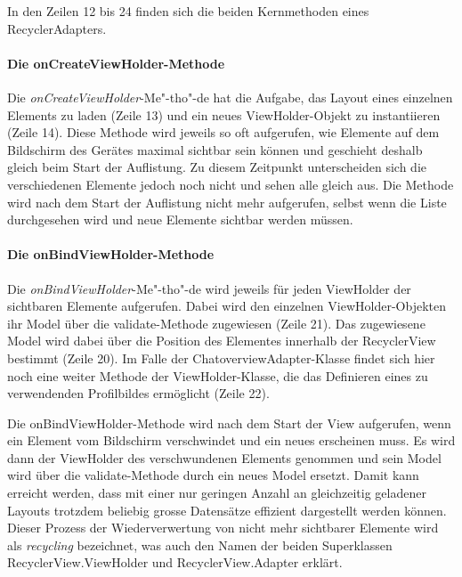 \documentclass[../main.tex]{subfiles}
\begin{document}
	In den Zeilen 12 bis 24 finden sich die beiden Kernmethoden eines RecyclerAdapters.
	
	\paragraph{Die onCreateViewHolder-Methode}
	Die \emph{onCreateViewHolder}-Me"-tho"-de hat die Aufgabe, das Layout eines einzelnen Elements zu laden (Zeile 13) und ein neues ViewHolder-Objekt zu instantiieren (Zeile 14). Diese Methode wird jeweils so oft aufgerufen, wie Elemente auf dem Bildschirm des Gerätes maximal sichtbar sein können und geschieht deshalb gleich beim Start der Auflistung. Zu diesem Zeitpunkt unterscheiden sich die verschiedenen Elemente jedoch noch nicht und sehen alle gleich aus. Die Methode wird nach dem Start der Auflistung nicht mehr aufgerufen, selbst wenn die Liste durchgesehen wird und neue Elemente sichtbar werden müssen.
	
	\paragraph{Die onBindViewHolder-Methode}
	\sloppy
	Die \emph{onBindViewHolder}-Me"-tho"-de \newline wird jeweils für jeden ViewHolder der sichtbaren Elemente aufgerufen. Dabei wird den einzelnen ViewHolder-Objekten ihr Model über die validate-Methode zugewiesen (Zeile 21). Das zugewiesene Model wird dabei über die Position des Elementes innerhalb der RecyclerView bestimmt (Zeile 20). Im Falle der ChatoverviewAdapter-Klasse findet sich hier noch eine weiter Methode der ViewHolder-Klasse, die das Definieren eines zu verwendenden Profilbildes ermöglicht (Zeile 22).
	\fussy
	
	Die onBindViewHolder-Methode wird nach dem Start der View aufgerufen, wenn ein Element vom Bildschirm verschwindet und ein neues erscheinen muss. Es wird dann der ViewHolder des verschwundenen Elements genommen und sein Model wird über die validate-Methode durch ein neues Model ersetzt. Damit kann erreicht werden, dass mit einer nur geringen Anzahl an gleichzeitig geladener Layouts trotzdem beliebig grosse Datensätze effizient dargestellt werden können. Dieser Prozess der Wiederverwertung von nicht mehr sichtbarer Elemente wird als \emph{recycling} bezeichnet, was auch den Namen der beiden Superklassen RecyclerView.ViewHolder und RecyclerView.Adapter erklärt.
	
\end{document}
